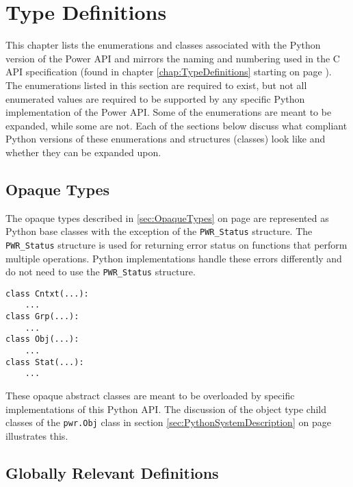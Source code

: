 \section{Type Definitions}\label{sec:PythonTypeDefinitions}

This chapter lists the enumerations and classes associated with the Python
version of the Power API and mirrors the naming and numbering used in the C
API specification (found in chapter \ref{chap:TypeDefinitions} starting on page
\pageref{chap:TypeDefinitions}). The enumerations listed in this section are
required to exist, but not all enumerated values are required to be supported
by any specific Python implementation of the Power API. Some of the
enumerations are meant to be expanded, while some are not. Each of the sections
below discuss what compliant Python versions of these enumerations and
structures (classes) look like and whether they can be expanded upon. 

\subsection{Opaque Types}\label{sec:PythonOpaqueTypes}
The opaque types described in \ref{sec:OpaqueTypes} on page
\pageref{sec:OpaqueTypes} are represented as Python base classes with the
exception of the \texttt{PWR_Status} structure. The \texttt{PWR_Status}
structure is used for returning error status on functions that perform multiple
operations.  Python implementations handle these errors differently and do not
need to use the \texttt{PWR_Status} structure.

\begin{center}\begin{minipage}{.95\linewidth}\begin{lstlisting}
class Cntxt(...):
    ...
class Grp(...):
    ...
class Obj(...):
    ...
class Stat(...):
    ...
\end{lstlisting}\end{minipage}\end{center}

These opaque abstract classes are meant to be overloaded by specific
implementations of this Python API. The discussion of the object type child
classes of the \texttt{pwr.Obj} class in section
\ref{sec:PythonSystemDescription} on page \pageref{sec:PythonSystemDescription}
illustrates this. 

\subsection{Globally Relevant Definitions}
\label{sec:PythonGloballyRelevantDefinitions} 

